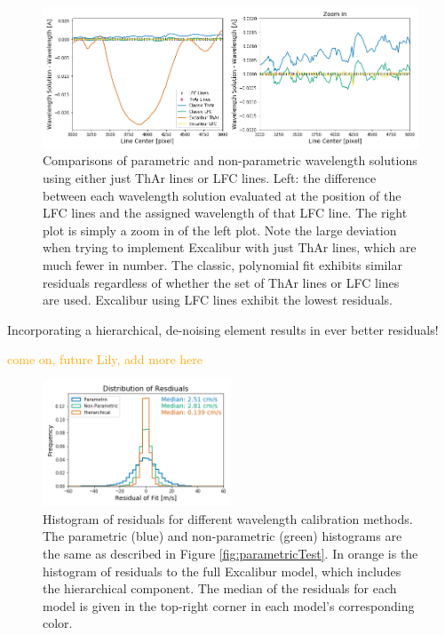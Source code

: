\documentclass[twocolumn]{aastex63}
\newcommand{\lz}[1]{\textcolor{orange}{#1}}
\begin{document}
\begin{figure}[h]
\centering
\includegraphics[width=\textwidth]{Figures/waveResids.png}
\caption{Comparisons of parametric and non-parametric wavelength solutions using either just ThAr lines or LFC lines. Left: the difference between each wavelength solution evaluated at the position of the LFC lines and the assigned wavelength of that LFC line.  The right plot is simply a zoom in of the left plot.  Note the large deviation when trying to implement Excalibur with just ThAr lines, which are much fewer in number.  The classic, polynomial  fit exhibits similar residuals regardless of whether the set of ThAr lines or LFC lines are used.  Excalibur using LFC lines exhibit the lowest residuals.}
\label{fig:waveResids}
\end{figure} 

Incorporating a hierarchical, de-noising element results in ever better residuals!

\lz{come on, future Lily, add more here}

\begin{figure}[h]
\centering
\includegraphics[width=0.5\textwidth]{Figures/allHists.png}
\caption{Histogram of residuals for different wavelength calibration methods.  The parametric (blue) and non-parametric (green) histograms are the same as described in Figure \ref{fig:parametricTest}.  In orange is the histogram of residuals to the full Excalibur model, which includes the hierarchical component.  The median of the residuals for each model is given in the top-right corner in each model's corresponding color.}
\label{fig:allHists}
\end{figure} 
\end{document}
